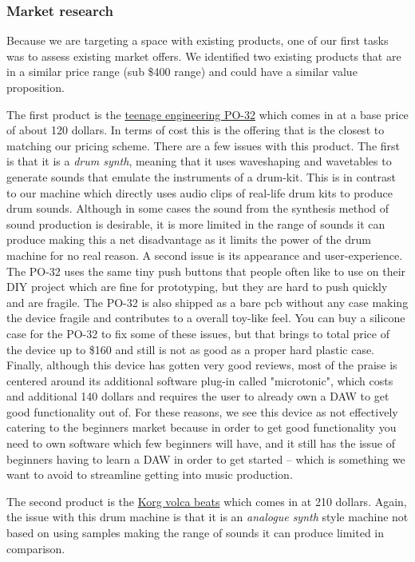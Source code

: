 \documentclass[11pt]{article}
\begin{document}
\subsubsection{Market research}
\label{sec:org5e132ec}
\label{org44573e9}

    Because we are targeting a space with existing products, one of
our first tasks was to assess existing market offers. We identified
two existing products that are in a similar price range (sub \$400
range) and could have a similar value proposition.

 The first product is the \href{https://teenage.engineering/products/po-32}{teenage engineering PO-32} which comes in at
a base price of about 120 dollars. In terms of cost this is the
offering that is the closest to matching our pricing scheme. There are
a few issues with this product. The first is that it is a \emph{drum
synth}, meaning that it uses waveshaping and wavetables to generate
sounds that emulate the instruments of a drum-kit. This is in contrast
to our machine which directly uses audio clips of real-life drum kits
to produce drum sounds. Although in some cases the sound from the
synthesis method of sound production is desirable, it is more limited
in the range of sounds it can produce making this a net disadvantage
as it limits the power of the drum machine for no real reason. A
second issue is its appearance and user-experience. The PO-32 uses the
same tiny push buttons that people often like to use on their DIY
project which are fine for prototyping, but they are hard to push
quickly and are fragile. The PO-32 is also shipped as a bare pcb
without any case making the device fragile and contributes to a
overall toy-like feel. You can buy a silicone case for the PO-32 to
fix some of these issues, but that brings to total price of the device
up to \$160 and still is not as good as a proper hard plastic
case. Finally, although this device has gotten very good reviews, most
of the praise is centered around its additional software plug-in
called "microtonic", which costs and additional 140 dollars and
requires the user to already own a DAW to get good functionality out
of. For these reasons, we see this device as not effectively catering
to the beginners market because in order to get good functionality you
need to own software which few beginners will have, and it still has
the issue of beginners having to learn a DAW in order to get started
-- which is something we want to avoid to streamline getting into
music production.

The second product is the \href{https://www.korg.com/caen/products/dj/volca\_beats/}{Korg volca beats} which comes in at 210 dollars.
Again, the issue with this drum machine is that it is an \emph{analogue synth} style
machine not based on using samples making the range of sounds it can produce
limited in comparison.
\end{document}
